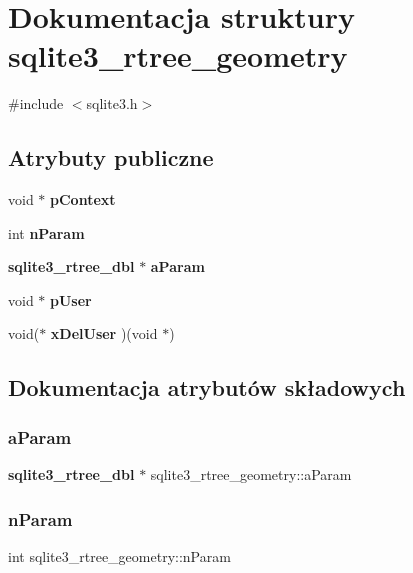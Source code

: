 \section{Dokumentacja struktury sqlite3\+\_\+rtree\+\_\+geometry}
\label{structsqlite3__rtree__geometry}


{\ttfamily \#include $<$sqlite3.\+h$>$}

\subsection*{Atrybuty publiczne}
\begin{DoxyCompactItemize}
\item 
void $\ast$ \textbf{ p\+Context}
\item 
int \textbf{ n\+Param}
\item 
\textbf{ sqlite3\+\_\+rtree\+\_\+dbl} $\ast$ \textbf{ a\+Param}
\item 
void $\ast$ \textbf{ p\+User}
\item 
void($\ast$ \textbf{ x\+Del\+User} )(void $\ast$)
\end{DoxyCompactItemize}


\subsection{Dokumentacja atrybutów składowych}
\mbox{\label{structsqlite3__rtree__geometry_a42eafbc0dcb02ed32a0a4b10ff887416}} 
\subsubsection{aParam}
{\footnotesize\ttfamily \textbf{ sqlite3\+\_\+rtree\+\_\+dbl} $\ast$ sqlite3\+\_\+rtree\+\_\+geometry\+::a\+Param}

\mbox{\label{structsqlite3__rtree__geometry_ada7b9eba82660e3321dd4c93526697c9}} 
\subsubsection{nParam}
{\footnotesize\ttfamily int sqlite3\+\_\+rtree\+\_\+geometry\+::n\+Param}

\mbox{\label{structsqlite3__rtree__geometry_a33f98691626846c1317419654d5c5f51}} 

